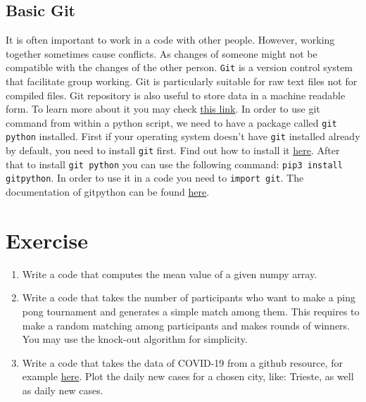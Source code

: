 \documentclass[10pt,a4paper]{article}
\newcommand{\te}{\texttt}
\begin{document}
\subsection{Basic Git}
It is often important to work in a code with other people. However, working together sometimes cause conflicts. As changes of someone might not be compatible with the changes of the other person. \te{Git} is a version control system that facilitate group working. Git is particularly suitable for raw text files not for compiled files. Git repository is also useful to store data in a machine readable form.  To learn more about it you may check \href{https://www.atlassian.com/git/tutorials}{this link}.
In order to use git command from within a python script, we need to have a package called \te{git python} installed. 
First if your operating system doesn't have \te{git} installed already by default, you need to install \te{git} first. Find out how to install it \href{https://git-scm.com/}{here}.
After that to install \te{git python} you can use the following command:
\te{pip3 install gitpython}. In order to use it in a code you need to \te{import git}. The documentation of gitpython can be found \href{https://gitpython.readthedocs.io/en/stable/intro.html}{here}.
















\section{Exercise}


\begin{enumerate}
\item Write a code that computes the mean value of a given numpy array. %
\item Write a code that takes the number of participants who want to make a  ping pong tournament and generates a simple match among them. This requires to make a random matching among participants and makes rounds of winners. You may use the knock-out algorithm for simplicity.  %
\item Write a code that takes the data of COVID-19 from a github resource, for example \href{https://github.com/pcm-dpc/COVID-19/tree/master/dati-province}{here}. Plot the daily new cases for a chosen city, like: Trieste, as well as daily new cases.
\end{enumerate}
\end{document}
